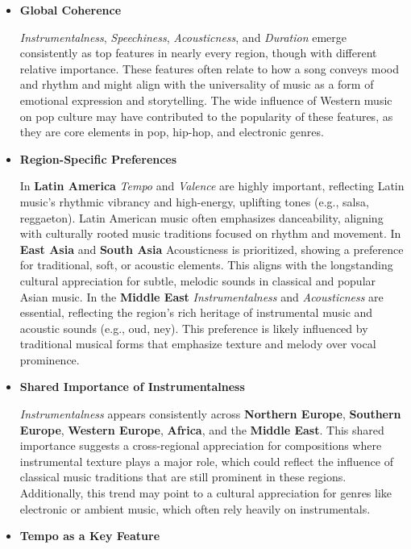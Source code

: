 \begin{itemize}

    \item\textbf{Global Coherence}

    \textit{Instrumentalness}, \textit{Speechiness}, \textit{Acousticness}, and \textit{Duration} emerge consistently as top features in nearly every region, though with different relative importance.
These features often relate to how a song conveys mood and rhythm and might align with the universality of music as a form of emotional expression and storytelling.
The wide influence of Western music on pop culture may have contributed to the popularity of these features, as they are core elements in pop, hip-hop, and electronic genres.


\item\textbf{Region-Specific Preferences}

In \textbf{Latin America} \textit{Tempo} and \textit{Valence} are highly important, reflecting Latin music's rhythmic vibrancy and high-energy, uplifting tones (e.g., salsa, reggaeton). Latin American music often emphasizes danceability, aligning with culturally rooted music traditions focused on rhythm and movement.
In \textbf{East Asia} and \textbf{South Asia} {Acousticness} is prioritized, showing a preference for traditional, soft, or acoustic elements. This aligns with the longstanding cultural appreciation for subtle, melodic sounds in classical and popular Asian music.
In the \textbf{Middle East} \textit{Instrumentalness} and \textit{Acousticness} are essential, reflecting the region's rich heritage of instrumental music and acoustic sounds (e.g., oud, ney). This preference is likely influenced by traditional musical forms that emphasize texture and melody over vocal prominence.


\item\textbf{Shared Importance of Instrumentalness}

\textit{Instrumentalness} appears consistently across \textbf{Northern Europe}, \textbf{Southern Europe}, \textbf{Western Europe}, \textbf{Africa}, and the \textbf{Middle East}. This shared importance suggests a cross-regional appreciation for compositions where instrumental texture plays a major role, which could reflect the influence of classical music traditions that are still prominent in these regions.
Additionally, this trend may point to a cultural appreciation for genres like electronic or ambient music, which often rely heavily on instrumentals.


\item\textbf{Tempo as a Key Feature}


\end{itemize}
